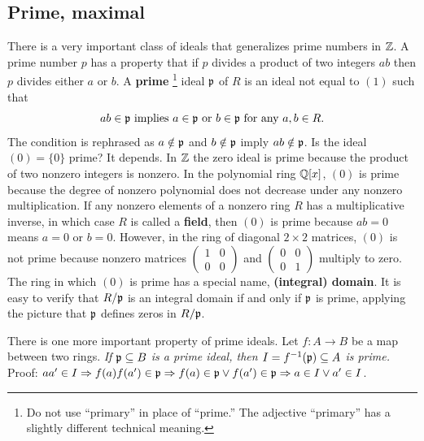 \subsection*{Prime, maximal}

There is a very important class of ideals that generalizes prime numbers in $\mathbb{Z}$.
A prime number $p$ has a property that if $p$ divides a product of two integers $ab$
then $p$ divides either $a$ or $b$. A {\bf prime}%
\footnote{Do not use ``primary'' in place of ``prime.'' The adjective ``primary'' has a slightly different technical meaning.}
ideal $\mathfrak{p}$ of $R$ is an ideal not equal to $(1)$ such that
\begin{equation}
ab \in \mathfrak{p} \text{ implies } a \in \mathfrak{p} \text{ or } b \in \mathfrak{p} \text{ for any } a,b \in R.
\label{cond-prime}
\end{equation}
The condition is rephrased as $a \notin \mathfrak{p}$ and $b \notin \mathfrak{p}$ imply $ab \notin \mathfrak{p}$.
Is the ideal $(0)=\{0\}$ prime? It depends. In $\mathbb{Z}$ the zero ideal is prime because the product of two nonzero integers is nonzero.
In the polynomial ring $\mathbb{Q}[x]$, $(0)$ is prime because the degree of nonzero polynomial does not decrease under any nonzero multiplication. 
If any nonzero elements of a nonzero ring $R$ has a multiplicative inverse, in which case $R$ is called a {\bf field},
then $(0)$ is prime because $ab = 0$ means $a = 0$ or $b = 0$.
However, in the ring of diagonal $2 \times 2$ matrices, 
$(0)$ is not prime because nonzero matrices $\begin{pmatrix} 1 & 0 \\ 0 & 0 \end{pmatrix}$
and $\begin{pmatrix} 0 & 0 \\ 0 & 1 \end{pmatrix}$ multiply to zero.
The ring in which $(0)$ is prime has a special name, {\bf (integral) domain}.
It is easy to verify that $R/\mathfrak{p}$ is an integral domain if and only if $\mathfrak{p}$ is prime,
applying the picture that $\mathfrak{p}$ defines zeros in $R/\mathfrak{p}$.


There is one more important property of prime ideals.
Let $f : A \to B$ be a map between two rings.
{\em If $\mathfrak{p} \subseteq B$ is a prime ideal, then $I = f^{-1}(\mathfrak{p}) \subseteq A$ is prime.}
Proof: $aa' \in I \Rightarrow f(a)f(a') \in \mathfrak{p} \Rightarrow f(a) \in \mathfrak{p} \vee f(a') \in \mathfrak{p} \Rightarrow a \in I \vee a' \in I$.

